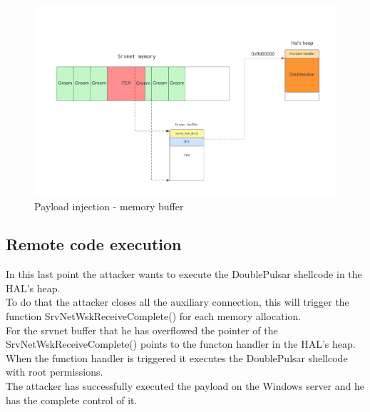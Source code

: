 \begin{figure}[ht!]
    \centering
      \includegraphics[scale=0.5]{images/exploit_6_buff.png}
      \caption{Payload injection - memory buffer}
\end{figure}

\clearpage
\subsection{Remote code execution}
In this last point the attacker wants to execute the DoublePulsar shellcode in the HAL's heap.\\
To do that the attacker closes all the auxiliary connection, this will trigger the function SrvNetWskReceiveComplete() for each memory allocation.\\
For the srvnet buffer that he has overflowed the pointer of the SrvNetWskReceiveComplete() points to the functon handler in the HAL's heap. 
When the function handler is triggered it executes the DoublePulsar shellcode with root permissions.\\
The attacker has successfully executed the payload on the Windows server and he has the complete control of it.

